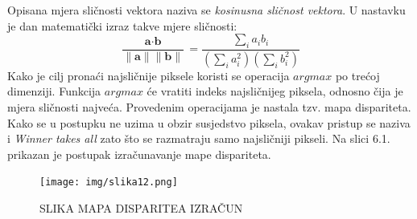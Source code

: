 \documentclass[times, utf8, zavrsni, numeric]{fer}
\begin{document}
Opisana mjera sličnosti vektora naziva se \textit{kosinusna sličnost vektora}. U nastavku je dan matematički izraz takve mjere sličnosti:
\begin{equation}
\frac{\textbf{a}\cdot\textbf{b}}{\parallel\textbf{a}\parallel \parallel\textbf{b}\parallel}=\frac{\sum_{i}a_{i}b_{i}}{(\sum_{i}a_{i}^2)(\sum_{i}b_{i}^2)}
\label{eq:normalizacija}
\end{equation}
Kako je cilj pronaći najsličnije piksele koristi se operacija $argmax$ po trećoj dimenziji. Funkcija $argmax$ će vratiti indeks najsličnijeg piksela, odnosno čija je mjera sličnosti najveća. Provedenim operacijama je nastala tzv. mapa dispariteta. Kako se u postupku ne uzima u obzir susjedstvo piksela, ovakav pristup se naziva i \textit{Winner takes all} zato što se razmatraju samo najsličniji pikseli. Na slici 6.1. prikazan je postupak izračunavanje mape dispariteta.
\begin{figure}[htb]
\centering
\texttt{[image: img/slika12.png]}
\caption{SLIKA MAPA DISPARITEA IZRAČUN}
\label{fig:KITTI}
\end{figure}
\end{document}
